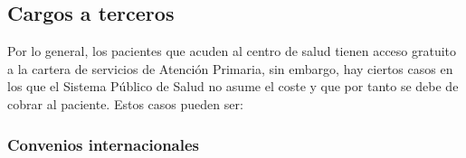






\subsection{Cargos a terceros}

Por lo general, los pacientes que acuden al centro de salud tienen acceso gratuito a la cartera de servicios de Atención Primaria, sin embargo, hay ciertos casos en los que el Sistema Público de Salud no asume el coste y que por tanto se debe de cobrar al paciente.
Estos casos pueden ser:

\subsubsection{Convenios internacionales}

